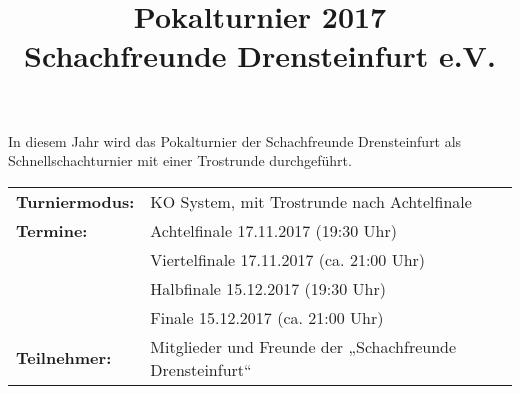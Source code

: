 \documentclass[a4paper,parskip=full-,DIV18]{scrartcl}
\title{Pokalturnier 2017\\Schachfreunde Drensteinfurt e.V.}
\date{}
\begin{document}
\maketitle

In diesem Jahr wird das Pokalturnier der Schachfreunde Drensteinfurt als Schnellschachturnier mit einer Trostrunde durchgeführt.

\bigskip

\begin{tabular}{p{3 cm} p{13.5 cm}}
	\textbf{Turniermodus:} & KO System, mit Trostrunde nach Achtelfinale                                                                                                                                                                                                                                                          \\
	\textbf{Termine:}      & Achtelfinale 17.11.2017 (19:30 Uhr)                                                                                                                                                                                                                                                                  \\
	                       & Viertelfinale 17.11.2017 (ca. 21:00 Uhr)                                                                                                                                                                                                                                                             \\
	                       & Halbfinale 15.12.2017 (19:30 Uhr)                                                                                                                                                                                                                                                                    \\
	                       & Finale 15.12.2017 (ca. 21:00 Uhr)                                                                                                                                                                                                                                                                    \\
	\textbf{Teilnehmer:}   & Mitglieder und Freunde der „Schachfreunde Drensteinfurt“                                                                                                                                                                                                                                             \\

\end{tabular}
\end{document}
